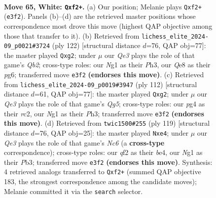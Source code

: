 \documentclass[11pt]{article}
\begin{document}
\clearpage

\begin{figure}[p]\centering
\begin{subfigure}{0.46\textwidth}\centering
\resizebox{\linewidth}{!}{%
\newchessgame
\chessboard[
  setfen={4Q3/8/p4k2/3P3p/2N3p1/4Q3/5q2/5KN1 w - - 0 65},
  showmover=false,
  pgfstyle=straightmove, color=movearrow, markmove={e3-f2}
]}
\caption{}
\end{subfigure}\hfill
\begin{subfigure}{0.46\textwidth}\centering
\resizebox{\linewidth}{!}{%
\newchessgame
\chessboard[
  setfen={8/7p/k5p1/5p2/5P2/7P/1Q4qK/4n3 w - - 0 62},
  showmover=false,
  pgfstyle=straightmove, color=movearrow, markmove={b2-g2}
]}
\caption{}
\end{subfigure}
\\[4pt]
\begin{subfigure}{0.46\textwidth}\centering
\resizebox{\linewidth}{!}{%
\newchessgame
\chessboard[
  setfen={8/8/4NP2/4p1Q1/2k5/7P/2r3qK/8 w - - 0 57},
  showmover=false,
  pgfstyle=straightmove, color=movearrow, markmove={g5-g2}
]}
\caption{}
\end{subfigure}\hfill
\begin{subfigure}{0.46\textwidth}\centering
\resizebox{\linewidth}{!}{%
\newchessgame
\chessboard[
  setfen={4Q3/6qk/7p/2P5/3PBP2/1pn4P/3r4/7K b - - 5 60},
  showmover=false,
  pgfstyle=straightmove, color=movearrow, markmove={c3-e4}
]}
\caption{}
\end{subfigure}
\caption{\textbf{Move 65, White: \texttt{Qxf2+}.} (a) Our position; Melanie plays \texttt{Qxf2+} (\texttt{e3f2}). Panels (b)--(d) are the retrieved master positions whose correspondence most drove this move (highest QAP objective among those that transfer to it). (b) Retrieved from \texttt{lichess\_elite\_2024-09\_p0021\#3724} (ply 122) [structural distance $d$=76, QAP obj=77]: the master played \texttt{Qxg2}; under $\mu$ our \emph{Qe3} plays the role of that game's \emph{Qb2}; cross-type roles: our \emph{N}g1 as their \emph{P}h3, our \emph{Q}e8 as their \emph{p}g6; transferred move \texttt{e3f2} \textbf{(endorses this move)}. (c) Retrieved from \texttt{lichess\_elite\_2024-09\_p0019\#3947} (ply 112) [structural distance $d$=61, QAP obj=77]: the master played \texttt{Qxg2}; under $\mu$ our \emph{Qe3} plays the role of that game's \emph{Qg5}; cross-type roles: our \emph{p}g4 as their \emph{r}c2, our \emph{N}g1 as their \emph{P}h3; transferred move \texttt{e3f2} \textbf{(endorses this move)}. (d) Retrieved from \texttt{twic1500\#255} (ply 119) [structural distance $d$=76, QAP obj=25]: the master played \texttt{Nxe4}; under $\mu$ our \emph{Qe3} plays the role of that game's \emph{Nc6} (a \textbf{cross-type} correspondence); cross-type roles: our \emph{q}f2 as their \emph{b}e4, our \emph{N}g1 as their \emph{P}b3; transferred move \texttt{e3f2} \textbf{(endorses this move)}. Synthesis: 4 retrieved analogs transferred to \texttt{Qxf2+} (summed QAP objective 183, the strongest correspondence among the candidate moves); Melanie committed it via the \texttt{search} selector.}
\label{fig:thought-m128}
\end{figure}
\end{document}
